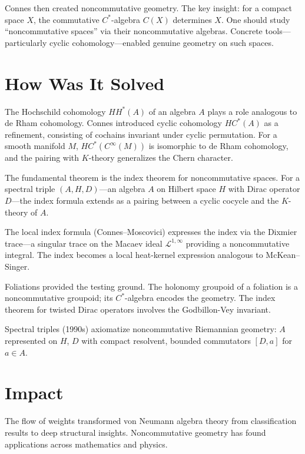 Connes then created noncommutative geometry. The key insight: for a
compact space $X$, the commutative $C^*$-algebra $C(X)$ determines $X$.
One should study ``noncommutative spaces'' via their noncommutative
algebras. Concrete tools---particularly cyclic cohomology---enabled
genuine geometry on such spaces.

\section*{How Was It Solved}

The Hochschild cohomology $HH^*(A)$ of an algebra $A$ plays a role
analogous to de Rham cohomology. Connes introduced cyclic cohomology
$HC^*(A)$ as a refinement, consisting of cochains invariant under cyclic
permutation. For a smooth manifold $M$, $HC^*(C^\infty(M))$ is isomorphic
to de Rham cohomology, and the pairing with $K$-theory generalizes the
Chern character.

The fundamental theorem is the index theorem for noncommutative spaces.
For a spectral triple $(A, H, D)$---an algebra $A$ on Hilbert space $H$
with Dirac operator $D$---the index formula extends as a pairing between
a cyclic cocycle and the $K$-theory of $A$.

The local index formula (Connes--Moscovici) expresses the index via the
Dixmier trace---a singular trace on the Macaev ideal
$\mathcal{L}^{1,\infty}$ providing a noncommutative integral. The index
becomes a local heat-kernel expression analogous to McKean--Singer.

Foliations provided the testing ground. The holonomy groupoid of a
foliation is a noncommutative groupoid; its $C^*$-algebra encodes the
geometry. The index theorem for twisted Dirac operators involves the
Godbillon-Vey invariant.

Spectral triples (1990s) axiomatize noncommutative Riemannian geometry:
$A$ represented on $H$, $D$ with compact resolvent, bounded commutators
$[D, a]$ for $a \in A$.

\section*{Impact}

The flow of weights transformed von Neumann algebra theory from
classification results to deep structural insights. Noncommutative
geometry has found applications across mathematics and physics.

